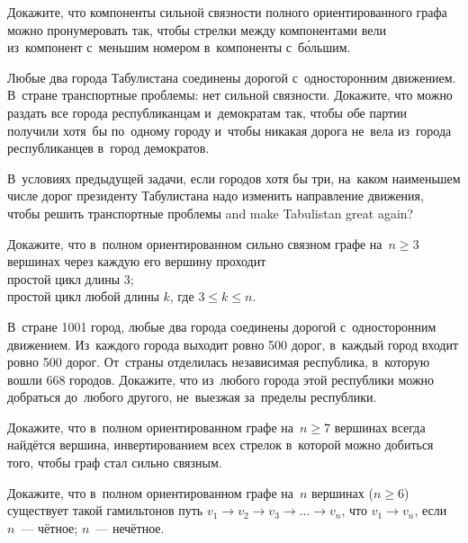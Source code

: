 \begin{problems}

\item
Докажите, что компоненты сильной связности полного ориентированного графа можно
пронумеровать так, чтобы стрелки между компонентами вели из~компонент с~меньшим
номером в~компоненты с~б\'{о}льшим.

\item
Любые два города Табулистана соединены дорогой с~односторонним движением.
В~стране транспортные проблемы: нет сильной связности.
Докажите, что можно раздать все города республиканцам и~демократам так, чтобы
обе партии получили хотя~бы по~одному городу и~чтобы никакая дорога не~вела
из~города республиканцев в~город демократов.

\item
В~условиях предыдущей задачи, если городов хотя бы три, на~каком наименьшем
числе дорог президенту Табулистана надо изменить направление движения, чтобы
решить транспортные проблемы and make Tabulistan great again?

\item
Докажите, что в~полном ориентированном сильно связном графе на~$n \geq 3$
вершинах через каждую его вершину проходит
\\
\subproblem простой цикл длины $3$;
\\
\subproblem простой цикл любой длины $k$, где $3 \leq k \leq n$.

\item
В~стране 1001 город, любые два города соединены дорогой с~односторонним
движением.
Из~каждого города выходит ровно 500 дорог, в~каждый город входит ровно 500
дорог.
От~страны отделилась независимая республика, в~которую вошли 668 городов.
Докажите, что из~любого города этой республики можно добраться до~любого
другого, не~выезжая за~пределы республики.

\item
Докажите, что в~полном ориентированном графе на~$n \geq 7$ вершинах всегда
найдётся вершина, инвертированием всех стрелок в~которой можно добиться того,
чтобы граф стал сильно связным.

\item
Докажите, что в~полном ориентированном графе на~$n$ вершинах ($n \geq 6$)
существует такой гамильтонов путь $v_1 \to v_2 \to v_3 \to \ldots \to v_{n}$,
что $v_{1} \to v_{n}$, если
\\
\subproblem $n$~--- чётное;
\qquad
\subproblem $n$~--- нечётное.



\end{problems}

